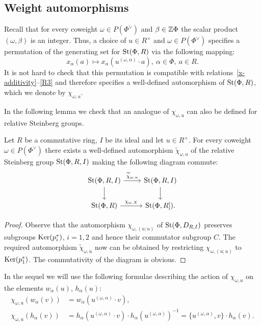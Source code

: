 \subsection{Weight automorphisms}\label{subsec:weight-automorphisms}
Recall that for every coweight $\omega \in P(\Phi^\vee)$ and $\beta \in \mathbb{Z} \Phi$ the scalar product $(\omega, \beta)$ is an integer.
Thus, a choice of $u \in R^\times$ and $\omega \in P(\Phi^\vee)$ specifies a permutation of the generating set for $\operatorname{St}(\Phi, R)$ via the following mapping:
\begin{equation*} x_\alpha(a) \mapsto x_\alpha(u^{(\omega, \alpha)} \cdot a),\ \alpha\in \Phi,\ a \in R. \end{equation*}
It is not hard to check that this permutation is compatible with relations~\eqref{x-additivity}--\eqref{R3} and therefore specifies a well-defined automorphism of $\operatorname{St}(\Phi, R)$, which we denote by $\chi_{\omega, u}$.

In the following lemma we check that an analogue of $\chi_{\omega, u}$ can also be defined for relative Steinberg groups.
\begin{lemma} \label{lem:relative-chi}
Let $R$ be a commutative ring, $I$ be its ideal and let $u \in R^\times$.
For every coweight $\omega \in P(\Phi^\vee)$ there exists a well-defined automorphism $\widetilde{\chi}_{\omega, u}$ of the relative Steinberg group $\operatorname{St}(\Phi, R, I)$ making the following diagram commute:
\[\begin{tikzcd} \St(\Phi, R, I) \ar[r, "\widetilde{\chi}_{\omega, u}"] \ar[d] & \St(\Phi, R, I) \ar[d] \\
\St(\Phi, R) \ar[r, "\chi_{\omega, X}"] & \St(\Phi, R]). \end{tikzcd}\]
\end{lemma}
\begin{proof}
    Observe that the automorphism $\chi_{\omega, (u; u)}$ of $\operatorname{St}(\Phi, D_{R, I})$ preserves subgroups
    $\operatorname{Ker}(p_i^*)$, $i=1, 2$ and hence their commutator subgroup $C$.
    The required automorphism $\widetilde{\chi}_{\omega, u}$ now can be obtained by restricting $\chi_{\omega, (u; u)}$ to $\operatorname{Ker}(p_1^*)$.
    The commutativity of the diagram is obvious.
\end{proof}

In the sequel we will use the following formulae describing the action of $\chi_{\omega, u}$ on the elements $w_\alpha(u)$, $h_\alpha(u)$:
\begin{align}
    \label{eq:chi-w} \chi_{\omega, u}\left(w_\alpha(v)\right) &= w_\alpha(u^{(\omega, \alpha)} \cdot v), \\
    \label{eq:chi-h} \chi_{\omega, u} (h_\alpha(v)) &= h_\alpha(u^{(\omega, \alpha)} \cdot v) \cdot h_\alpha(u^{(\omega, \alpha)})^{-1} = \{u^{(\omega, \alpha)}, v\} \cdot h_\alpha(v).
\end{align}

